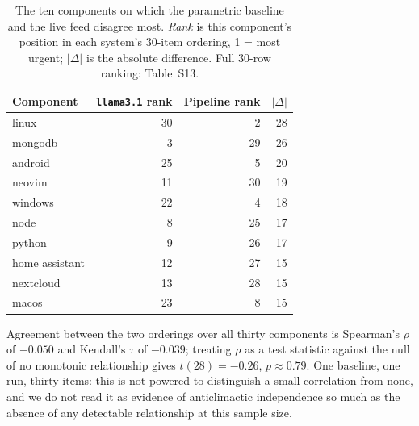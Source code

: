 \documentclass[acmsmall,review,anonymous,screen]{acmart}
\begin{document}
\begin{table}[t]
\caption{The ten components on which the parametric baseline and the live
feed disagree most. \emph{Rank} is this component's position in each
system's 30-item ordering, 1 = most urgent; $|\Delta|$ is the absolute
difference. Full 30-row ranking: Table~S13.}
\label{tab:update-order-top}
\begin{tabular}{lrrr}
\toprule
Component & \texttt{llama3.1} rank & Pipeline rank & $|\Delta|$ \\
\midrule
linux           & 30 & 2  & 28 \\
mongodb         & 3  & 29 & 26 \\
android         & 25 & 5  & 20 \\
neovim          & 11 & 30 & 19 \\
windows         & 22 & 4  & 18 \\
node            & 8  & 25 & 17 \\
python          & 9  & 26 & 17 \\
home assistant  & 12 & 27 & 15 \\
nextcloud       & 13 & 28 & 15 \\
macos           & 23 & 8  & 15 \\
\bottomrule
\end{tabular}
\end{table}

Agreement between the two orderings over all thirty components is Spearman's
$\rho$ of $-0.050$ and Kendall's $\tau$ of $-0.039$; treating $\rho$ as a test
statistic against the null of no monotonic relationship gives $t(28) =
-0.26$, $p \approx 0.79$. One baseline, one run, thirty items: this is not
powered to distinguish a small correlation from none, and we do not read it
as evidence of anticlimactic independence so much as the absence of any
detectable relationship at this sample size.
\end{document}
